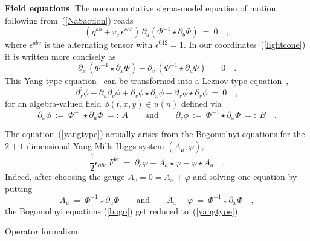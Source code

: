 \documentclass[a4paper,11pt]{article}
\makeatletter
\renewcommand{\section}{\@startsection{section}{1}{0pt}{\medskipamount}
{\medskipamount}{\large\bf}}
\numberwithin{equation}{section}
\def\eps{\epsilon}
\def\pa{\mbox{$\partial$}}
\def\sfrac#1#2{{\textstyle\frac{#1}{#2}}}
\makeatother
\begin{document}
\noindent
{\bf Field equations}.
The noncommutative sigma-model equation of motion
following from~(\ref{NaSaction}) reads
\begin{equation}
(\eta^{ab}+v_c\,\eps^{cab})\,\pa_a (\Phi^{-1}\star\pa_b \Phi)\ =\ 0\quad,
\end{equation}
where $\eps^{abc}$ is the alternating tensor with $\eps^{012}{=}1$.
In our coordinates~(\ref{lightcone}) it is written more concisely as
\begin{equation} \label{yangtype}
\pa_x\,(\Phi^{-1}\star\pa_x\Phi)-\pa_v\,(\Phi^{-1}\star\pa_u\Phi)\ =\ 0 \quad.
\end{equation}
This Yang-type equation~\cite{Y} can be transformed
into a Leznov-type equation~\cite{L},
\begin{equation} \label{leznovtype}
\pa_x^2\phi -\pa_u\pa_v\phi +
\pa_v \phi \star \pa_x \phi - \pa_x \phi \star \pa_v \phi \ =\ 0 \quad ,
\end{equation}
for an algebra-valued field $\phi(t,x,y)\in u(n)$ defined via
\begin{equation} \label{Lax}
\pa_x\phi\ :=\ \Phi^{-1}\star\pa_u\Phi\ =:\ A
\qquad\textrm{and}\qquad
\pa_v\phi\ :=\ \Phi^{-1}\star\pa_x\Phi\ =:\ B \quad.
\end{equation}

The equation~(\ref{yangtype}) actually arises from the Bogomolnyi
equations for the $2{+}1$ dimensional Yang-Mills-Higgs system
$(A_\mu,\varphi)$,
\begin{equation}\label{bogo}
\sfrac{1}{2}\eps_{abc}\,F^{bc}\ =\
\pa_a \varphi + A_a \star\varphi - \varphi\star A_a \quad.
\end{equation}
Indeed, after choosing the gauge $A_v=0=A_x{+}\varphi$
and solving one equation by putting
\begin{equation}
A_u\ =\ \Phi^{-1} \star \pa_u \Phi \qquad\textrm{and}\qquad
A_x-\varphi\ =\ \Phi^{-1} \star \pa_x \Phi \quad,
\end{equation}
the Bogomolnyi equations (\ref{bogo}) get reduced to~(\ref{yangtype}).


\section{Operator formalism}
\end{document}
